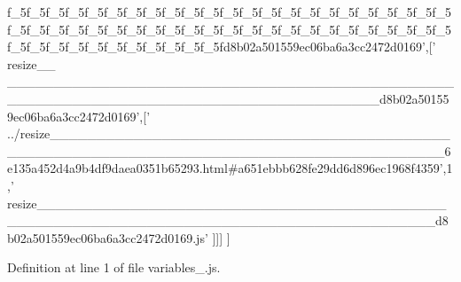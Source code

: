 \begin{DoxyCode}
{      f\_5f\_5f\_5f\_5f\_5f\_5f\_5f\_5f\_5f\_5f\_5f\_5f\_5f\_5f\_5f\_5f\_5f\_5f\_5f\_5f\_5f\_5f\_5f\_5f\_5f\_5f\_5f\_5f\_5f\_5f\_5f\_5f\_5f\_5f\_5f\_5f\_5f\_5f\_5f\_5f\_5f\_5f\_5f\_5f\_5f\_5f\_5f\_5f\_5f\_5f\_5f\_5f\_5f\_5f\_5f\_5f\_5fd8b02a501559ec06ba6a3cc2472d0169'},[\textcolor{stringliteral}{'
      resize\_\_
      \_\_\_\_\_\_\_\_\_\_\_\_\_\_\_\_\_\_\_\_\_\_\_\_\_\_\_\_\_\_\_\_\_\_\_\_\_\_\_\_\_\_\_\_\_\_\_\_\_\_\_\_\_\_\_\_\_\_\_\_\_\_\_\_\_\_\_\_\_\_\_\_\_\_\_\_\_\_\_\_\_\_\_\_\_\_\_\_d8b02a501559ec06ba6a3cc2472d0169'},[\textcolor{stringliteral}{'
      ../resize\_\_\_\_\_\_\_\_\_\_\_\_\_\_\_\_\_\_\_\_\_\_\_\_\_\_\_\_\_\_\_\_\_\_\_\_\_\_\_\_\_\_\_\_\_\_\_\_\_\_\_\_\_\_\_\_\_\_\_\_\_\_\_\_\_\_\_\_\_\_\_\_\_\_\_\_\_\_\_\_\_\_\_\_\_\_\_\_\_\_6e135a452d4a9b4df9daea0351b65293.html#a651ebbb628fe29dd6d896ec1968f4359'},1,\textcolor{stringliteral}{'
      resize\_\_\_\_\_\_\_\_\_\_\_\_\_\_\_\_\_\_\_\_\_\_\_\_\_\_\_\_\_\_\_\_\_\_\_\_\_\_\_\_\_\_\_\_\_\_\_\_\_\_\_\_\_\_\_\_\_\_\_\_\_\_\_\_\_\_\_\_\_\_\_\_\_\_\_\_\_\_\_\_\_\_\_\_\_\_\_\_\_\_d8b02a501559ec06ba6a3cc2472d0169.js'}
      ]]]
]
\end{DoxyCode}


Definition at line 1 of file variables\+\_.\+js.

